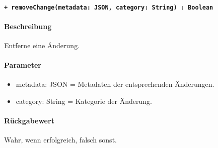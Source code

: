 \paragraph{\texttt{+ removeChange(metadata: JSON, category: String) : Boolean}}\label{AP_Changes_removeChange}%
\paragraph*{Beschreibung}
Entferne eine Änderung.
\paragraph*{Parameter}
\begin{itemize}
    \item metadata: JSON = Metadaten der entsprechenden Änderungen.
    \item category: String = Kategorie der Änderung.
\end{itemize}
\paragraph*{Rückgabewert}
Wahr, wenn erfolgreich, falsch sonst.